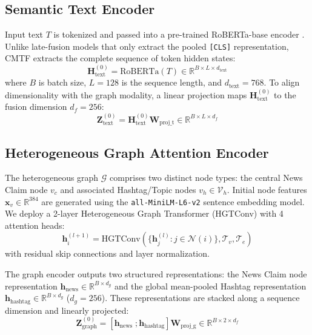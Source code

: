 \documentclass[conference]{IEEEtran}
\begin{document}
\subsection{Semantic Text Encoder}
Input text $T$ is tokenized and passed into a pre-trained RoBERTa-base encoder \cite{liu2019roberta}. Unlike late-fusion models that only extract the pooled \texttt{[CLS]} representation, CMTF extracts the complete sequence of token hidden states:
\begin{equation}
\mathbf{H}_{\text{text}}^{(0)} = \text{RoBERTa}(T) \in \mathbb{R}^{B \times L \times d_{\text{text}}}
\end{equation}
where $B$ is batch size, $L=128$ is the sequence length, and $d_{\text{text}} = 768$. To align dimensionality with the graph modality, a linear projection maps $\mathbf{H}_{\text{text}}^{(0)}$ to the fusion dimension $d_f = 256$:
\begin{equation}
\mathbf{Z}_{\text{text}}^{(0)} = \mathbf{H}_{\text{text}}^{(0)} \mathbf{W}_{\text{proj\_t}} \in \mathbb{R}^{B \times L \times d_f}
\end{equation}

\subsection{Heterogeneous Graph Attention Encoder}
The heterogeneous graph $\mathcal{G}$ comprises two distinct node types: the central News Claim node $v_c$ and associated Hashtag/Topic nodes $v_h \in \mathcal{V}_h$. Initial node features $\mathbf{x}_v \in \mathbb{R}^{384}$ are generated using the \texttt{all-MiniLM-L6-v2} sentence embedding model. We deploy a 2-layer Heterogeneous Graph Transformer (HGTConv) \cite{hu2020heterogeneous} with 4 attention heads:
\begin{equation}
\mathbf{h}_i^{(l+1)} = \text{HGTConv}\left(\{\mathbf{h}_j^{(l)} : j \in \mathcal{N}(i)\}, \mathcal{T}_v, \mathcal{T}_e\right)
\end{equation}
with residual skip connections and layer normalization. 

The graph encoder outputs two structured representations: the News Claim node representation $\mathbf{h}_{\text{news}} \in \mathbb{R}^{B \times d_g}$ and the global mean-pooled Hashtag representation $\mathbf{h}_{\text{hashtag}} \in \mathbb{R}^{B \times d_g}$ ($d_g = 256$). These representations are stacked along a sequence dimension and linearly projected:
\begin{equation}
\mathbf{Z}_{\text{graph}}^{(0)} = [\mathbf{h}_{\text{news}} \;; \mathbf{h}_{\text{hashtag}}] \mathbf{W}_{\text{proj\_g}} \in \mathbb{R}^{B \times 2 \times d_f}
\end{equation}
\end{document}
